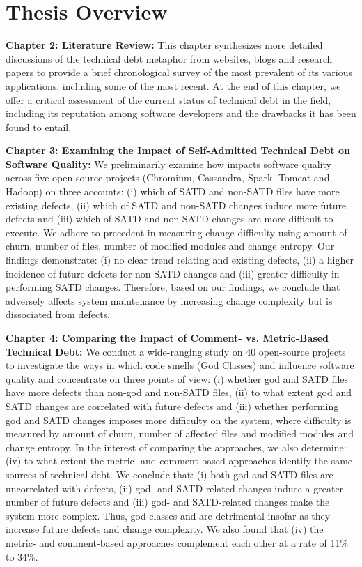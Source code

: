 \fi
 

\section{Thesis Overview}

\textbf{Chapter 2: Literature Review:} This chapter synthesizes more detailed discussions of the technical debt metaphor from websites, blogs and research papers to provide a brief chronological survey of the most prevalent of its various applications, including some of the most recent.  At the end of this chapter, we offer a critical assessment of the current status of technical debt in the field, including its reputation among software developers and the drawbacks it has been found to entail.

\textbf{Chapter 3: Examining the Impact of Self-Admitted Technical Debt on Software Quality:} We preliminarily examine how \SATD impacts software quality across five open-source projects (Chromium, Cassandra, Spark, Tomcat and Hadoop) on three accounts: (i) which of SATD and non-SATD files have more existing defects, (ii) which of SATD and non-SATD changes induce more future defects and (iii) which of SATD and non-SATD changes are more difficult to execute. We adhere to precedent in measuring change difficulty using amount of churn, number of files, number of modified modules and change entropy. Our findings demonstrate: (i) no clear trend relating \SATD and existing defects, (ii) a higher incidence of future defects for non-SATD changes and (iii) greater difficulty in performing SATD changes. Therefore, based on our findings, we conclude that \SATD adversely affects system maintenance by increasing change complexity but is dissociated from defects.

\textbf{Chapter 4: Comparing the Impact of Comment- vs. Metric-Based Technical Debt:} We conduct a wide-ranging study on 40 open-source projects to investigate the ways in which code smells (God Classes) and \SATD influence software quality and concentrate on three points of view: (i) whether god and SATD files have more defects than non-god and non-SATD files, (ii) to what extent god and SATD changes are correlated with future defects and (iii) whether performing god and SATD changes imposes more difficulty on the system, where difficulty is measured by amount of churn, number of affected files and modified modules and change entropy. In the interest of comparing the approaches, we also determine: (iv) to what extent the metric- and comment-based approaches identify the same sources of technical debt. We conclude that: (i) both god and SATD files are uncorrelated with defects, (ii) god- and SATD-related changes induce a greater number of future defects and (iii) god- and SATD-related changes make the system more complex. Thus, god classes and \SATD are detrimental insofar as they increase future defects and change complexity. We also found that (iv) the metric- and comment-based approaches complement each other at a rate of 11\% to 34\%.

